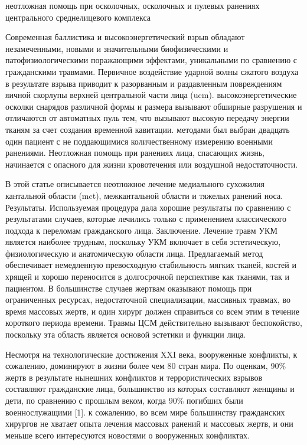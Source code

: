 неотложная помощь при осколочных, осколочных и пулевых ранениях центрального
среднелицевого комплекса

Современная баллистика и высокоэнергетический взрыв обладают незамеченными,
новыми и значительными биофизическими и патофизиологическими поражающими
эффектами, уникальными по сравнению с гражданскими травмами. Первичное
воздействие ударной волны сжатого воздуха в результате взрыва приводит к
разорванным и раздавленным повреждениям яичной скорлупы верхней центральной
части лица (ucm). высокоэнергетические осколки снарядов различной формы и
размера вызывают обширные разрушения и отличаются от автоматных пуль тем, что
вызывают высокую передачу энергии тканям за счет создания временной кавитации.
методами был выбран двадцать один пациент с не поддающимися количественному
измерению военными ранениями. Неотложная помощь при ранениях лица, спасающих
жизнь, начинается с опасного для жизни кровотечения или воздушной
недостаточности. 

В этой статье описывается неотложное лечение медиального
сухожилия кантальной области (mct), межкантальной области и тяжелых ранений
носа. Результаты. Используемая процедура дала хорошие результаты по сравнению с
результатами случаев, которые лечились только с применением классического
подхода к переломам гражданского лица. Заключение. Лечение травм УКМ является
наиболее трудным, поскольку УКМ включает в себя эстетическую, физиологическую и
анатомическую области лица. Предлагаемый метод обеспечивает немедленную
превосходную стабильность мягких тканей, костей и хрящей и хорошо переносится в
долгосрочной перспективе как тканями, так и пациентом. В большинстве случаев
жертвам оказывают помощь при ограниченных ресурсах, недостаточной специализации,
массивных травмах, во время массовых жертв, и один хирург должен справиться со
всем этим в течение короткого периода времени. Травмы ЦСМ действительно вызывают
беспокойство, поскольку эта область является основой эстетики и функции лица.

Несмотря на технологические достижения XXI века, вооруженные конфликты, к
сожалению, доминируют в жизни более чем 80 стран мира. По оценкам, 90\% жертв в
результате нынешних конфликтов и террористических взрывов составляют гражданские
лица, большинство из которых составляют женщины и дети, по сравнению с прошлым
веком, когда 90\% погибших были военнослужащими [1]. к сожалению, во всем мире
большинству гражданских хирургов не хватает опыта лечения массовых ранений и
массовых жертв, и они меньше всего интересуются новостями о вооруженных
конфликтах.

